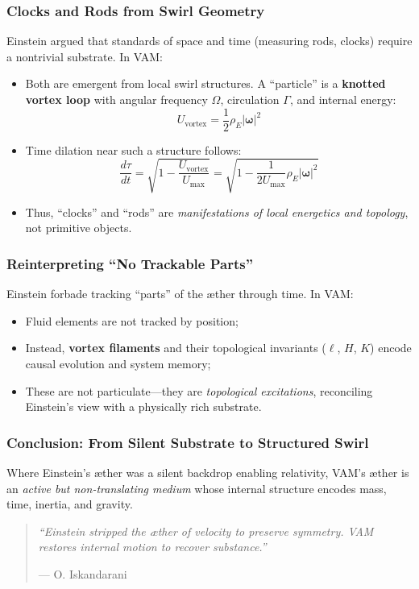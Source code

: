 \medskip

\subsubsection*{Clocks and Rods from Swirl Geometry}
Einstein argued that standards of space and time (measuring rods, clocks) require a nontrivial substrate. In VAM:
\begin{itemize}
    \item Both are emergent from local swirl structures. A “particle” is a \textbf{knotted vortex loop} with angular frequency \( \Omega \), circulation \( \Gamma \), and internal energy:
    \[
        U_{\text{vortex}} = \frac{1}{2} \rho_{\scriptscriptstyle\boldsymbol\!E}|\boldsymbol{\omega}|^2
    \]
    \item Time dilation near such a structure follows:
    \[
        \frac{d\tau}{dt} = \sqrt{1 - \frac{U_{\text{vortex}}}{U_{\text{max}}}} = \sqrt{1 - \frac{1}{2U_{\text{max}}} \rho_{\scriptscriptstyle\boldsymbol\!E}|\boldsymbol{\omega}|^2}
    \]
    \item Thus, “clocks” and “rods” are \emph{manifestations of local energetics and topology}, not primitive objects.
\end{itemize}

\medskip

\subsubsection*{Reinterpreting “No Trackable Parts”}
Einstein forbade tracking “parts” of the æther through time. In VAM:
\begin{itemize}
    \item Fluid elements are not tracked by position;
    \item Instead, \textbf{vortex filaments} and their topological invariants (\( \ell \), \( H \), \( K \)) encode causal evolution and system memory;
    \item These are not particulate—they are \emph{topological excitations}, reconciling Einstein’s view with a physically rich substrate.
\end{itemize}

\medskip

\subsubsection*{Conclusion: From Silent Substrate to Structured Swirl}
Where Einstein’s æther was a silent backdrop enabling relativity, VAM’s æther is an \emph{active but non-translating medium} whose internal structure encodes mass, time, inertia, and gravity.
\vspace{0.5em}


\begin{quote}
\textit{“Einstein stripped the æther of velocity to preserve symmetry. VAM restores internal motion to recover substance.”}
\begin{flushright}
— O. Iskandarani
\end{flushright}
\end{quote}
